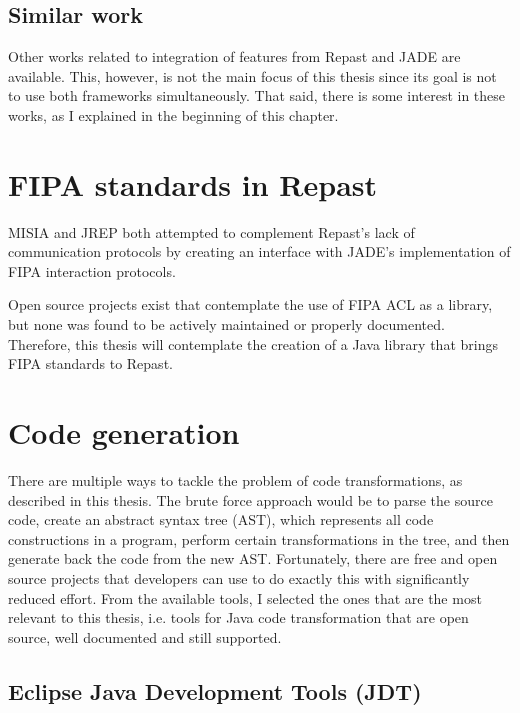 \subsection{Similar work}
	Other works related to integration of features from Repast and JADE are available. This, however, is not the main focus of this thesis since its goal is not to use both frameworks simultaneously. That said, there is some interest in these works, as I explained in the beginning of this chapter. 


\section{FIPA standards in Repast}
	MISIA and JREP both attempted to complement Repast's lack of communication protocols by creating an interface with JADE's implementation of FIPA interaction protocols. 

	Open source projects exist that contemplate the use of FIPA ACL as a library, but none was found to be actively maintained or properly documented. Therefore, this thesis will contemplate the creation of a Java library that brings FIPA standards to Repast.


\section{Code generation}
	There are multiple ways to tackle the problem of code transformations, as described in this thesis. The brute force approach would be to parse the source code, create an abstract syntax tree (AST), which represents all code constructions in a program, perform certain transformations in the tree, and then generate back the code from the new AST. Fortunately, there are free and open source projects that developers can use to do exactly this with significantly reduced effort. From the available tools, I selected the ones that are the most relevant to this thesis, i.e. tools for Java code transformation that are open source, well documented and still supported. 

\subsection{Eclipse Java Development Tools (JDT)}


